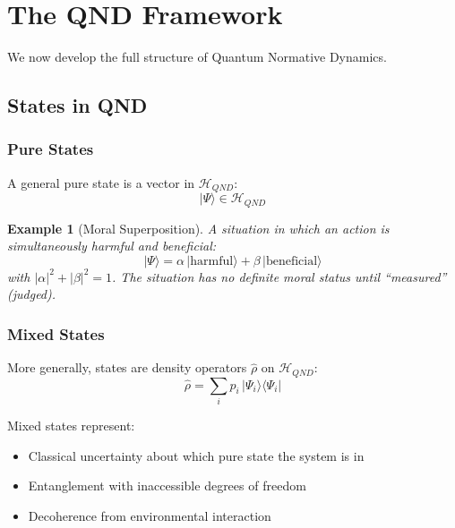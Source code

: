 \documentclass[12pt]{article}
\newtheorem{example}{Example}[section]
\begin{document}
\section{The QND Framework}

We now develop the full structure of Quantum Normative Dynamics.

\subsection{States in QND}

\subsubsection{Pure States}

A general pure state is a vector in $\mathcal{H}_{QND}$:
\begin{equation}
    |\Psi\rangle \in \mathcal{H}_{QND}
\end{equation}

\begin{example}[Moral Superposition]
A situation in which an action is simultaneously harmful and beneficial:
\begin{equation}
    |\Psi\rangle = \alpha \,|\text{harmful}\rangle + \beta \,|\text{beneficial}\rangle
\end{equation}
with $|\alpha|^2 + |\beta|^2 = 1$. The situation has no definite moral status until ``measured'' (judged).
\end{example}

\subsubsection{Mixed States}

More generally, states are density operators $\hat{\rho}$ on $\mathcal{H}_{QND}$:
\begin{equation}
    \hat{\rho} = \sum_i p_i \,|\Psi_i\rangle \langle \Psi_i|
\end{equation}

Mixed states represent:
\begin{itemize}
    \item Classical uncertainty about which pure state the system is in
    \item Entanglement with inaccessible degrees of freedom
    \item Decoherence from environmental interaction
\end{itemize}
\end{document}
